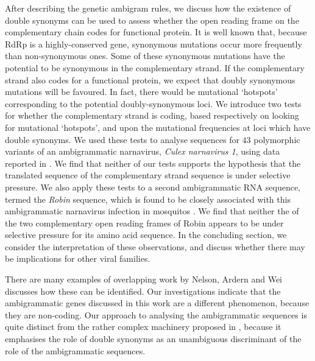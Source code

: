 \documentclass[unnumsec,webpdf,contemporary,large,namedate]{oup-authoring-template}%
\theoremstyle{thmstyleone}%
\theoremstyle{thmstyletwo}%
\theoremstyle{thmstylethree}%
\begin{document}
After describing the genetic ambigram rules, we discuss how the existence of double synonyms 
can be used to assess whether the open reading frame on the complementary chain codes for 
functional protein. It is well known that, because RdRp is a highly-conserved gene, synonymous 
mutations occur more frequently than non-synonymous ones. Some of these synonymous 
mutations have the potential to be synonymous in the complementary strand. If the complementary 
strand also codes for a functional protein, we expect that doubly synonymous mutations will be 
favoured. In fact, there would be mutational \lq hotspots' corresponding to the potential 
doubly-synonymous loci. We introduce two tests for whether the complementary strand 
is coding, based respectively on looking for mutational \lq hotspots', and upon the mutational
frequencies at loci which have double synonyms. We used these tests to analyse sequences for 
$43$ polymorphic variants of an ambigrammatic narnavirus, \emph{Culex narnavirus 1}, 
using data reported in \cite{Bat+20}. We find that neither of our tests supports the hypothesis 
that the translated sequence of the complementary strand sequence 
is under selective pressure. We also apply these tests to a second ambigrammatic RNA sequence, 
termed the \emph{Robin} sequence, which is found to be closely associated with this 
ambigrammatic narnavirus infection in mosquitos . We find that neither the of the two 
complementary open reading frames of Robin appears to be under selective pressure for its amino acid sequence. 
In the concluding section, we consider the interpretation of these observations, and discuss whether there 
may be implications for other viral families. 

There are many examples of overlapping  
work by Nelson, Ardern and Wei \citep{Nel+20} discusses how these can be identified. 
Our investigations indicate that the ambigrammatic genes discussed in this work are a 
different phenomenon, because they are non-coding. Our approach to analysing the ambigrammatic 
sequences is quite distinct from the rather complex machinery proposed in \cite{Nel+20}, because 
it emphasises the role of double synonyms as an unambiguous discriminant of the role of the ambigrammatic 
sequences.
\end{document}
